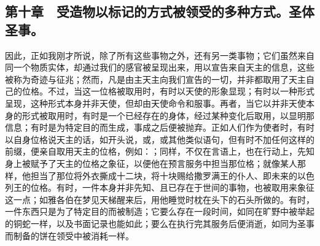 
\subsection{第十章　受造物以标记的方式被领受的多种方式。圣体圣事。}

因此，正如我刚才所说，除了所有这些事物之外，还有另一类事物；它们虽然来自同一个物质实体，却通过我们的感官被呈现出来，用以宣告来自天主的信息，这些被称为奇迹与征兆；然而，凡是由主天主向我们宣告的一切，并非都取用了天主自己的位格。不过，当这一位格被取用时，有时以天使的形象显现；有时以一种形式呈现，这种形式本身并非天使，但却由天使命令和服事。再者，当它以并非天使本身的形式被取用时，有时是一个已经存在的身体，经过某种变化后取用，以显明那信息；有时是为特定目的而生成，事成之后便被抛弃。正如人们作为使者时，有时以自身位格说天主的话，如开头说，或，或其他类似语句，但有时不加任何这样的前缀，便亲自取用天主的位格，例如：；同样，不仅在言语上，也在行动上，先知身上被赋予了天主的位格之象征，以便他在预言服务中担当那位格；就像某人那样，他担当了那位将外衣撕成十二块，将十块赐给撒罗满王的仆人、即未来的以色列王的位格。有时，一件本身并非先知、且已存在于世间的事物，也被取用来象征这一点；如雅各伯在梦见天梯醒来后，用他睡觉时枕在头下的石头所做的。有时，一件东西只是为了特定目的而被制造；它要么存在一段时间，如同在旷野中被举起的铜蛇一样，以及书面记录也能如此；要么在执行完其服务后便消逝，如同为圣事而制备的饼在领受中被消耗一样。\par

